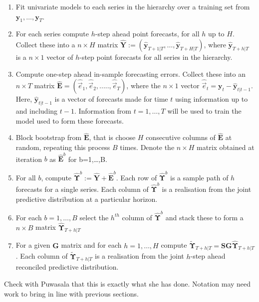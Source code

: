 \documentclass[graybox]{svmult}
\begin{document}
\begin{enumerate}
	\item Fit univariate models to each series in the hierarchy over a training set from ${\bm y}_1,\ldots,{\bm y}_T$.
	\item For each series compute $h$-step ahead point forecasts, for all $h$ up to $H$. Collect these into a $n\times H$ matrix $\hat{\bm Y}:=(\hat{\bm{y}}_{T+1|T},\ldots,\hat{\bm{y}}_{T+H|T})$, where $\hat{\bm{y}}_{T+h|T}$ is a $n\times 1$ vector of $h$-step point forecasts for all series in the hierarchy.
	\item Compute one-step ahead in-sample forecasting errors. Collect these into an $n \times T$ matrix ${\hat{\bm E}}=(\hat{\vec{e}}_1,\hat{\vec{e}}_2,.....,\hat{\vec{e}}_T)$, where the $n\times 1$ vector $\hat{\vec{e}}_t={\bm y}_t-\hat{\bm {y}}_{t|t-1}$.  Here, $\hat{\bm {y}}_{t|t-1}$ is a vector of forecasts made for time $t$ using information up to and including $t-1$. Information from $t=1,\dots,T$ will be used to train the model used to form these forecasts.
	\item Block bootstrap from $\hat{\bm{E}}$, that is choose $H$ consecutive columns of $\hat{{\bm E}}$ at random, repeating this process $B$ times.  Denote the $n\times H$ matrix obtained at iteration $b$ as $\hat{{\bm E}}^b$ for b=1,\ldots,B.
	\item For all $b$, compute $\hat{\bm \Upsilon}^b:=\hat{\bm Y}+{\bm \hat{E}}^b$. Each row of $\hat{\bm \Upsilon}^b$ is a sample path of $h$ forecasts for a single series.  Each column of $\hat{\bm \Upsilon}^b$ is a realisation from the joint predictive distribution at a particular horizon.
	\item For each $b=1,\ldots,B$ select the $h^{th}$ column of $\hat{\bm \Upsilon}^b$ and stack these to form a $n\times B$ matrix $\hat{\bm{\Upsilon}}_{T+h|T}$
	\item For a given ${\bm G}$ matrix and for each $h=1,\ldots,H$ compute $\tilde{\bm{\Upsilon}}_{T+h|T}={\bm S}{\bm G}\hat{\bm{\Upsilon}}_{T+h|T}$.   Each column of $\tilde{\bm \Upsilon}_{T+h|T}$ is a realisation from the joint $h$-step ahead reconciled predictive distribution.
\end{enumerate}


{\color{red}Check with Puwasala that this is exactly what she has done.  Notation may need work to bring in line with previous sections.}

\end{document}
